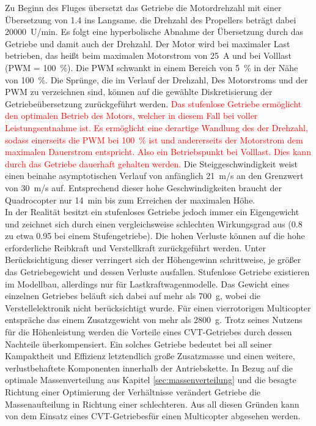 Zu Beginn des Fluges übersetzt das Getriebe die Motordrehzahl mit einer Übersetzung von \SI{1,4}{} ins Langsame. die Drehzahl des Propellers beträgt dabei \SI{20000}{U/min}. Es folgt eine hyperbolische Abnahme der Übersetzung durch das Getriebe und damit auch der Drehzahl. Der Motor wird bei maximaler Last betrieben, das heißt beim maximalen Motorstrom von \SI{25}{A} und bei Volllast (PWM =  \SI{100}{\%}). Die PWM schwankt in einem Bereich von \SI{5}{\%} in der Nähe von \SI{100}{\%}. Die Sprünge, die im Verlauf der Drehzahl, Des Motorstroms und der PWM zu verzeichnen sind, können auf die gewählte Diskretisierung der Getriebeübersetzung zurückgeführt werden. \textcolor{red}{Das stufenlose Getriebe ermöglicht den optimalen Betrieb des Motors, welcher in diesem Fall bei voller Leistungsentnahme ist. Es ermöglicht eine derartige Wandlung des der Drehzahl, sodass einerseits die PWM bei \SI{100}{\%} ist und andererseits der Motorstrom dem maximalen Dauerstrom entspricht. Also ein Betriebspunkt bei Volllast. Dies kann durch das Getriebe dauerhaft gehalten werden.} 
Die Steiggeschwindigkeit weist einen beinahe asymptotischen Verlauf von anfänglich \SI{21}{m/s} an den Grenzwert von \SI{30}{m/s} auf. Entsprechend dieser hohe Geschwindigkeiten braucht der Quadrocopter nur \SI{14}{min} bis zum Erreichen der maximalen Höhe. \\
In der Realität besitzt ein stufenloses Getriebe jedoch immer ein Eigengewicht und zeichnet sich durch einen vergleichsweise schlechten Wirkungsgrad aus (\SI{0.8}{} zu etwa \SI{0.95}{} bei einem Stufengetriebe)\cite{Fischer.2016}.
 Die hohen Verluste können auf die hohe erforderliche Reibkraft und Verstellkraft zurückgeführt werden. Unter Berücksichtigung dieser verringert sich der Höhengewinn schrittweise, je größer das Getriebegewicht und dessen Verluste ausfallen. Stufenlose Getriebe existieren im Modellbau, allerdings nur für Lastkraftwagenmodelle. Das Gewicht eines einzelnen Getriebes beläuft sich dabei auf mehr als \SI{700}{g}, wobei die Verstellelektronik nicht berücksichtigt wurde. Für einen vierrotorigen Multicopter entspräche das einem Zusatzgewicht von mehr als \SI{2800}{g}. 
Trotz seines Nutzens für die Höhenleistung werden die Vorteile eines CVT-Getriebes durch dessen Nachteile überkompensiert. Ein solches Getriebe bedeutet bei all seiner Kampaktheit und Effizienz letztendlich große Zusatzmasse und einen weitere, verlustbehaftete Komponenten innerhalb der Antriebskette. In Bezug auf die optimale Massenverteilung aus Kapitel \ref{sec:massenverteilung} und die besagte Richtung einer Optimierung der Verhältnisse verändert Getriebe die Massenaufteilung in Richtung einer schlechteren. Aus all diesen Gründen kann von dem Einsatz eines CVT-Getriebesfür einen Multicopter abgesehen werden.



